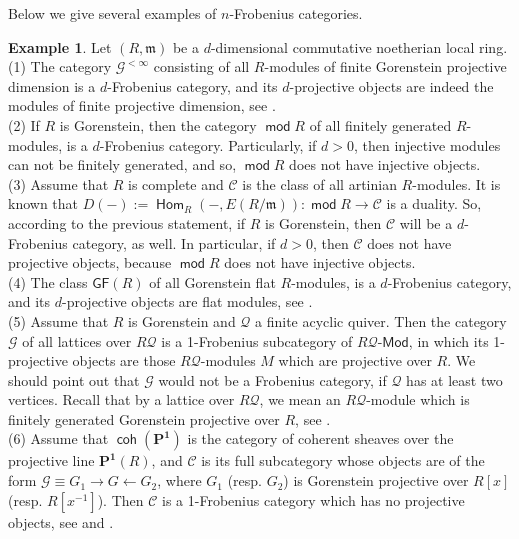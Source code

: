 \documentclass[11pt,a4paper]{amsart}
\newcommand{\rt}{\rightarrow}
\newcommand{\lrt}{\longrightarrow}
\newcommand{\lf}{\leftarrow}
\newcommand{\Md}{\mathsf{Mod}}
\newcommand{\Q}{\mathcal{Q} }
\newcommand{\C}{\mathscr{C} }
\newcommand{\G}{\mathcal{G} }
\newcommand{\m}{\mathfrak{m}}
\def\hom{\operatorname{{\mathsf{Hom}}}}
\def\hom{\operatorname{\mathsf{Hom}}}
\def\G{\mathcal{G}}
\def\md{\operatorname{\mathsf{mod}}}
\def\coh{\operatorname{\mathsf{coh}}}
\theoremstyle{definition}
\newtheorem{example}[theorem]{Example}
\theoremstyle{plain}
\theoremstyle{definition}
\numberwithin{equation}{section}
\begin{document}
Below we give several examples of $n$-Frobenius categories.
\begin{example}\label{ex}
Let $(R, \m)$ be a $d$-dimensional commutative noetherian local ring.\\ (1) The category $\G^{<\infty}$ consisting of all $R$-modules of finite Gorenstein projective dimension is a $d$-Frobenius category, and its $d$-projective objects are indeed the modules of finite projective dimension, see \cite[Example 2.16]{bfss}.\\
{(2) If $R$ is Gorenstein, then the category $\md R$ of all finitely generated $R$-modules, is a $d$-Frobenius category. Particularly, if $d>0$, then injective modules can not be finitely generated, and so, $\md R$ does not have injective objects.\\ (3) Assume that $R$ is  complete  and $\C$ is the class of all artinian $R$-modules. It is known that $D(-):=\hom_{R}(-, E(R/{\m})):\md R\lrt\C$ is a duality. So, according to the previous statement, if $R$ is Gorenstein, then $\C$ will be a $d$-Frobenius category, as well. In particular, if $d>0$, then $\C$ does not have projective objects, because $\md R$ does not have injective objects.}\\ (4) The class $\mathsf{GF}(R)$ of all Gorenstein flat $R$-modules, is a $d$-Frobenius category, and its $d$-projective objects are flat modules, see \cite[Example 2.3(2)]{bfss1}.\\ (5) Assume that $R$ is Gorenstein and $\Q$ a finite acyclic quiver. Then the category  $\G$ of all lattices over $R\Q$ is a 1-Frobenius subcategory of $R\Q$-$\Md$, in which its 1-projective objects are those $R\Q$-modules $M$ which are projective over $R$. We should point out that $\G$ would not be a Frobenius category, if $\Q$ has at least two vertices. Recall that by a lattice over $R\Q$, we mean an $R\Q$-module  which is finitely generated Gorenstein projective over $R$, see \cite[Example 2.6]{bfss1}.\\
(6) Assume that $\coh(\mathbf{P^{1}})$ is the category of  coherent sheaves over the projective line $\mathbf{P^{1}}(R)$, and $\C$
is its full subcategory whose objects are of the form $ \G\equiv G_1 \rt G \lf G_2$, where $G_1$ (resp. $G_2$) is Gorenstein projective over $R[x]$ (resp. $R[x^{-1}]$). Then $\C$ is a 1-Frobenius category which has no projective objects, see \cite[Appendix A]{bfss1} and \cite[Corollary 2.3]{ee}.
\end{example}
\end{document}
